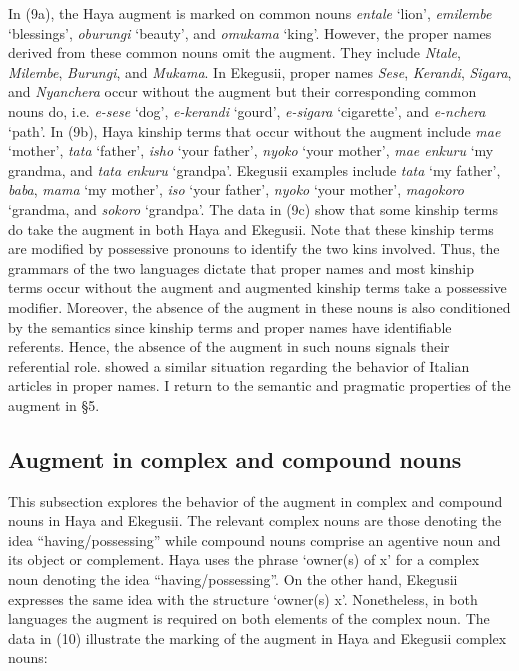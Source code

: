 \documentclass[output=paper]{langscibook}
\begin{document}
In (9a), the Haya augment is marked on common nouns \textit{entale} ‘lion’, \textit{emilembe} ‘blessings’, \textit{oburungi} ‘beauty’, and \textit{omukama} ‘king’. However, the proper names derived from these common nouns omit the augment. They include \textit{Ntale}, \textit{Milembe}, \textit{Burungi}, and \textit{Mukama}. In Ekegusii, proper names \textit{Sese}, \textit{Kerandi}, \textit{Sigara}, and \textit{Nyanchera} occur without the augment but their corresponding common nouns do, i.e. \textit{e-sese} ‘dog’, \textit{e-kerandi} ‘gourd’, \textit{e-sigara} ‘cigarette’, and \textit{e-nchera} ‘path’. In (9b), Haya kinship terms that occur without the augment include \textit{mae} ‘mother’, \textit{tata} ‘father’, \textit{isho} ‘your father’, \textit{nyoko} ‘your mother’, \textit{mae enkuru} ‘my grandma, and \textit{tata enkuru} ‘grandpa’. Ekegusii examples include \textit{tata} ‘my father’, \textit{baba}, \textit{mama} ‘my mother’, \textit{iso} ‘your father’, \textit{nyoko} ‘your mother’, \textit{magokoro} ‘grandma, and \textit{sokoro} ‘grandpa’. The data in (9c) show that some kinship terms do take the augment in both Haya and Ekegusii. Note that these kinship terms are modified by possessive pronouns to identify the two kins involved. Thus, the grammars of the two languages dictate that proper names and most kinship terms occur without the augment and augmented kinship terms take a possessive modifier. Moreover, the absence of the augment in these nouns is also conditioned by the semantics since kinship terms and proper names have identifiable referents. Hence, the absence of the augment in such nouns signals their referential role. \citet{longobardi1994reference} showed a similar situation regarding the behavior of Italian articles in proper names. I return to the semantic and pragmatic properties of the augment in §5. 			


\subsection{Augment in complex and compound nouns}
This subsection explores the behavior of the augment in complex and compound nouns in Haya and Ekegusii. The relevant complex nouns are those denoting the idea “having/possessing” while compound nouns comprise an agentive noun and its object or complement. Haya uses the phrase ‘owner(s) of x’ for a complex noun denoting the idea “having/possessing”. On the other hand, Ekegusii expresses the same idea with the structure ‘owner(s) x’. Nonetheless, in both languages the augment is required on both elements of the complex noun. The data in (10) illustrate the marking of the augment in Haya and Ekegusii complex nouns:
\end{document}
